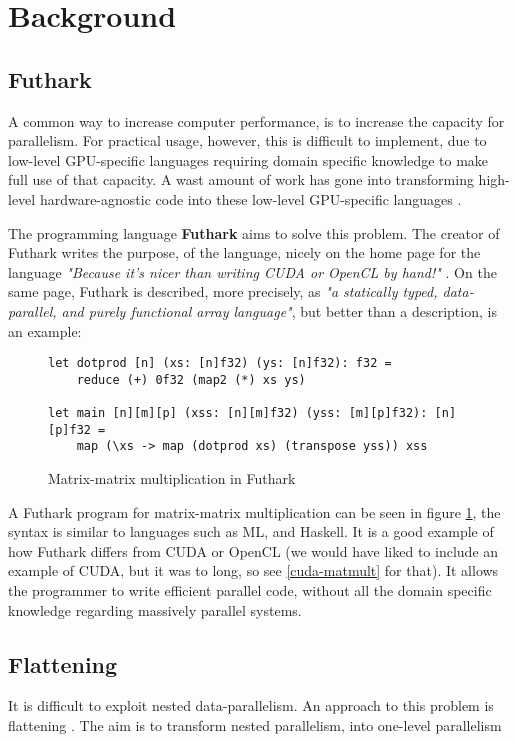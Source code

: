 \section{Background}
\subsection{Futhark}
A common way to increase computer performance, is to increase the capacity for parallelism. For practical usage, however, this is difficult to implement, due to low-level GPU-specific languages requiring domain specific knowledge to make full use of that capacity. A wast amount of work has gone into transforming high-level hardware-agnostic code into these low-level GPU-specific languages \cite{inc-flat}. 

The programming language \textbf{Futhark} aims to solve this problem. The creator of Futhark writes the purpose, of the language, nicely on the home page for the language \textit{"Because it’s nicer than writing CUDA or OpenCL by hand!"} \cite{futhark-home}. On the same page, Futhark is described, more precisely, as \textit{"a statically typed, data-parallel, and purely functional array language"}, but better than a description, is an example:
\begin{figure}[H]
\centering
\lstset{language=haskell}
\begin{lstlisting}
let dotprod [n] (xs: [n]f32) (ys: [n]f32): f32 =
	reduce (+) 0f32 (map2 (*) xs ys)

let main [n][m][p] (xss: [n][m]f32) (yss: [m][p]f32): [n][p]f32 =
	map (\xs -> map (dotprod xs) (transpose yss)) xss
\end{lstlisting}%
\caption{Matrix-matrix multiplication in Futhark \cite{ppopp}}
\label{matmultFuthark}
\end{figure}
\noindent A Futhark program for matrix-matrix multiplication can be seen in figure \ref{matmultFuthark}, the syntax is similar to languages such as ML, and Haskell. It is a good example of how Futhark differs from CUDA or OpenCL (we would have liked to include an example of CUDA, but it was to long, so see \ref{cuda-matmult} for that). It allows the programmer to write efficient parallel code, without all the domain specific knowledge regarding massively parallel systems. 

\subsection{Flattening}
It is difficult to exploit nested data-parallelism. An approach to this problem is flattening \cite{flat}. The aim is to transform nested parallelism, into one-level parallelism

